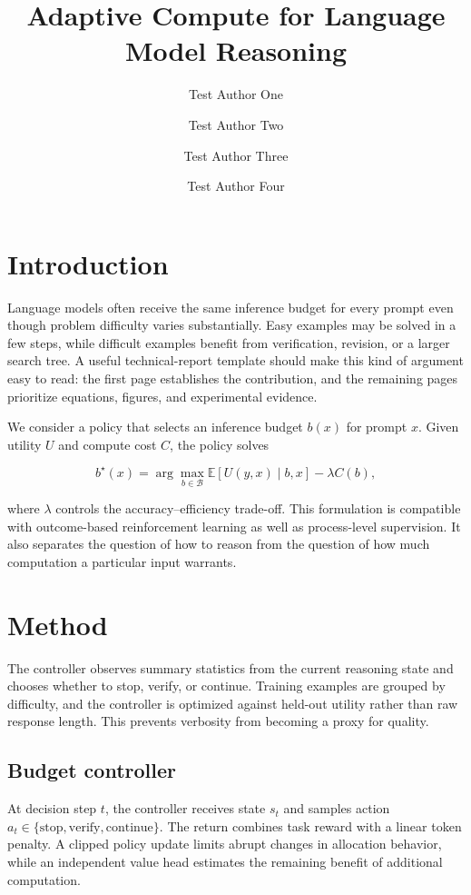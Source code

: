 \documentclass[11pt,onecolumn]{cleantechnicalreport}
\title{Adaptive Compute for Language Model Reasoning}
\author[1]{Test Author One}
\author[1]{Test Author Two}
\author[2]{Test Author Three}
\author[1,2,$\dagger$]{Test Author Four}
\affil[1]{Test Research Organization One}
\affil[2]{Test University Two}
\begin{document}
\maketitle

\section{Introduction}

Language models often receive the same inference budget for every prompt even
though problem difficulty varies substantially. Easy examples may be solved in a
few steps, while difficult examples benefit from verification, revision, or a
larger search tree. A useful technical-report template should make this kind of
argument easy to read: the first page establishes the contribution, and the
remaining pages prioritize equations, figures, and experimental evidence.

We consider a policy that selects an inference budget $b(x)$ for prompt $x$.
Given utility $U$ and compute cost $C$, the policy solves

\begin{equation}
  b^{\star}(x)
  = \arg\max_{b \in \mathcal{B}}
    \mathbb{E}\!\left[U(y,x) \mid b,x\right] - \lambda C(b),
  \label{eq:budget-policy}
\end{equation}

where $\lambda$ controls the accuracy--efficiency trade-off. This formulation is
compatible with outcome-based reinforcement learning as well as process-level
supervision. It also separates the question of how to reason from the question
of how much computation a particular input warrants.

\section{Method}

The controller observes summary statistics from the current reasoning state and
chooses whether to stop, verify, or continue. Training examples are grouped by
difficulty, and the controller is optimized against held-out utility rather than
raw response length. This prevents verbosity from becoming a proxy for quality.

\subsection{Budget controller}

At decision step $t$, the controller receives state $s_t$ and samples action
$a_t \in \{\text{stop},\text{verify},\text{continue}\}$. The return combines task
reward with a linear token penalty. A clipped policy update limits abrupt changes
in allocation behavior, while an independent value head estimates the remaining
benefit of additional computation.
\end{document}
